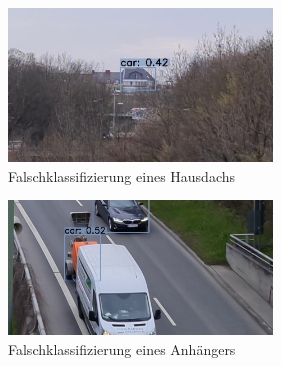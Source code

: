 \documentclass[conference]{IEEEtran}
\begin{document}
	\begin{figure}[!h]
		\begin{center}
			\includegraphics[width=7cm]{Media/Output_108 - Kopie (2).jpg}
			\caption{Falschklassifizierung eines Hausdachs}
			\label{FaK3}
		\end{center}
	\end{figure}
	\begin{figure}[!h]
		\begin{center}
			\includegraphics[width=7cm]{Media/Output_829 - Kopie.jpg}
			\caption{Falschklassifizierung eines Anhängers}
			\label{FaK4}
		\end{center}
	\end{figure}\\
	
\end{document}

